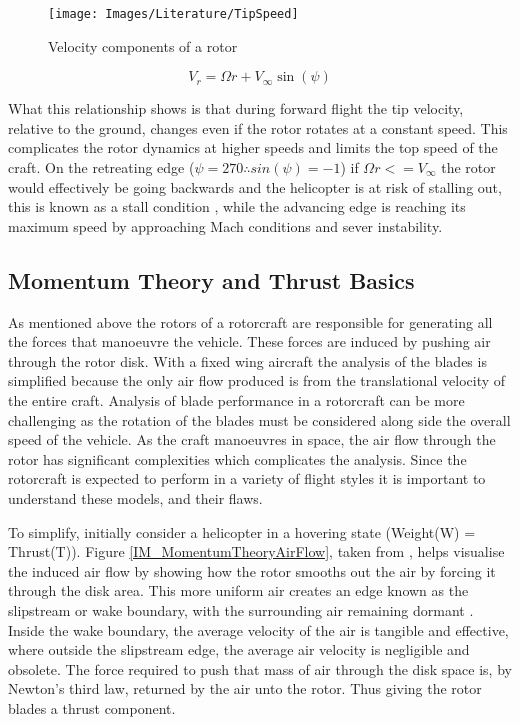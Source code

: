 	\begin{figure}[H]
		\centering
		\texttt{[image: Images/Literature/TipSpeed]}
		\caption{Velocity components of a rotor \cite{Leishman}}
		\label{IM_TipSpeed}
	\end{figure}
		
	\begin{equation}
	\label{EQ_TipSpeed}
	V_{r} = \Omega r + V_{\infty}\sin(\psi)
	\end{equation}
	
	What this relationship shows is that during forward flight the tip velocity, relative to the ground, changes even if the rotor rotates at a constant speed. This complicates the rotor dynamics at higher speeds and limits the top speed of the craft. On the retreating edge ($\psi = 270$\textdegree $\therefore sin(\psi) = -1$) if $\Omega r <= V_{\infty}$ the rotor would effectively be going backwards and the helicopter is at risk of stalling out, this is known as a stall condition \cite{Leishman} \cite{RotorCraftHand}, while the advancing edge is reaching its maximum speed by approaching Mach conditions and sever instability.

	\subsection{Momentum Theory and Thrust Basics}
	
	As mentioned above the rotors of a rotorcraft are responsible for generating all the forces that manoeuvre the vehicle. These forces are induced by pushing air through the rotor disk. With a fixed wing aircraft the analysis of the blades is simplified because the only air flow produced is from the translational velocity of the entire craft. Analysis of blade performance in a rotorcraft can be more challenging as the rotation of the blades must be considered along side the overall speed of the vehicle. As the craft manoeuvres in space, the air flow through the rotor has significant complexities which complicates the analysis. Since the rotorcraft is expected to perform in a variety of flight styles it is important to understand these models, and their flaws. 
	
	To simplify, initially consider a helicopter in a hovering state (Weight(W) = Thrust(T)). Figure \ref{IM_MomentumTheoryAirFlow}, taken from \cite{Leishman}, helps visualise the induced air flow by showing how the rotor smooths out the air by forcing it through the disk area. This more uniform air creates an edge known as the slipstream or wake boundary, with the surrounding air remaining dormant \cite{Leishman}. Inside the wake boundary, the average velocity of the air is tangible and effective, where outside the slipstream edge, the average air velocity is negligible and obsolete. The force required to push that mass of air through the disk space is, by Newton's third law, returned by the air unto the rotor. Thus giving the rotor blades a thrust component.
	  
